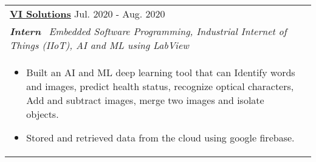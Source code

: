 \documentclass[a4paper,8pt]{article}
\begin{document}
\begin{tabularx}{\linewidth}{ @{}l r@{} }
\color[HTML]{1C033C} \textbf{\uline{\href{http://www.visolutions.org/}{VI Solutions}}} \hfill \color[HTML]{371e77} Jul. 2020 - Aug. 2020 \\[4pt]
\color[HTML]{371e77}\textbf{\textit{Intern}}\ \hfill \color[HTML]{4B28A4} \textit{Embedded Software Programming, Industrial Internet of Things (IIoT), AI and ML using LabView} \\[4pt]
\begin{minipage}[t]{\linewidth}
    \begin{itemize}[nosep,after=\strut, leftmargin=2em, itemsep=2pt]
        \item  Built an AI and ML deep learning tool that can Identify words and images, predict health status, recognize optical characters, Add and subtract images, merge two images and isolate objects. 
        \item Stored and retrieved data from the cloud using google firebase.
    \end{itemize}
\end{minipage}
\end{tabularx}

\end{document}
